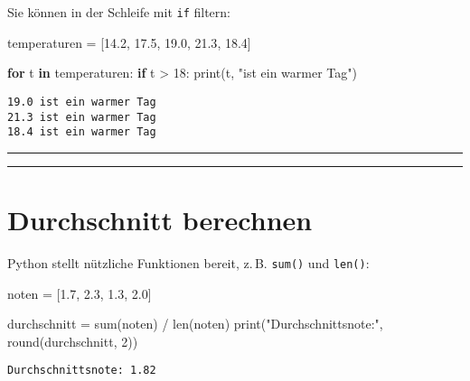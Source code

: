 \documentclass[
  letterpaper,
  DIV=11,
  numbers=noendperiod]{scrreprt}
\newenvironment{Shaded}{\begin{snugshade}}{\end{snugshade}}
\newcommand{\BuiltInTok}[1]{\textcolor[rgb]{0.00,0.23,0.31}{#1}}
\newcommand{\ControlFlowTok}[1]{\textcolor[rgb]{0.00,0.23,0.31}{\textbf{#1}}}
\newcommand{\DecValTok}[1]{\textcolor[rgb]{0.68,0.00,0.00}{#1}}
\newcommand{\FloatTok}[1]{\textcolor[rgb]{0.68,0.00,0.00}{#1}}
\newcommand{\KeywordTok}[1]{\textcolor[rgb]{0.00,0.23,0.31}{\textbf{#1}}}
\newcommand{\NormalTok}[1]{\textcolor[rgb]{0.00,0.23,0.31}{#1}}
\newcommand{\OperatorTok}[1]{\textcolor[rgb]{0.37,0.37,0.37}{#1}}
\newcommand{\StringTok}[1]{\textcolor[rgb]{0.13,0.47,0.30}{#1}}
\begin{document}
Sie können in der Schleife mit \texttt{if} filtern:

\begin{Shaded}
\begin{Highlighting}[]
\NormalTok{temperaturen }\OperatorTok{=}\NormalTok{ [}\FloatTok{14.2}\NormalTok{, }\FloatTok{17.5}\NormalTok{, }\FloatTok{19.0}\NormalTok{, }\FloatTok{21.3}\NormalTok{, }\FloatTok{18.4}\NormalTok{]}

\ControlFlowTok{for}\NormalTok{ t }\KeywordTok{in}\NormalTok{ temperaturen:}
    \ControlFlowTok{if}\NormalTok{ t }\OperatorTok{\textgreater{}} \DecValTok{18}\NormalTok{:}
        \BuiltInTok{print}\NormalTok{(t, }\StringTok{"ist ein warmer Tag"}\NormalTok{)}
\end{Highlighting}
\end{Shaded}

\begin{verbatim}
19.0 ist ein warmer Tag
21.3 ist ein warmer Tag
18.4 ist ein warmer Tag
\end{verbatim}

\begin{center}\rule{0.5\linewidth}{0.5pt}\end{center}

\begin{center}\rule{0.5\linewidth}{0.5pt}\end{center}

\section{Durchschnitt berechnen}\label{durchschnitt-berechnen}

Python stellt nützliche Funktionen bereit, z.\,B. \texttt{sum()} und
\texttt{len()}:

\begin{Shaded}
\begin{Highlighting}[]
\NormalTok{noten }\OperatorTok{=}\NormalTok{ [}\FloatTok{1.7}\NormalTok{, }\FloatTok{2.3}\NormalTok{, }\FloatTok{1.3}\NormalTok{, }\FloatTok{2.0}\NormalTok{]}

\NormalTok{durchschnitt }\OperatorTok{=} \BuiltInTok{sum}\NormalTok{(noten) }\OperatorTok{/} \BuiltInTok{len}\NormalTok{(noten)}
\BuiltInTok{print}\NormalTok{(}\StringTok{"Durchschnittsnote:"}\NormalTok{, }\BuiltInTok{round}\NormalTok{(durchschnitt, }\DecValTok{2}\NormalTok{))}
\end{Highlighting}
\end{Shaded}

\begin{verbatim}
Durchschnittsnote: 1.82
\end{verbatim}
\end{document}
